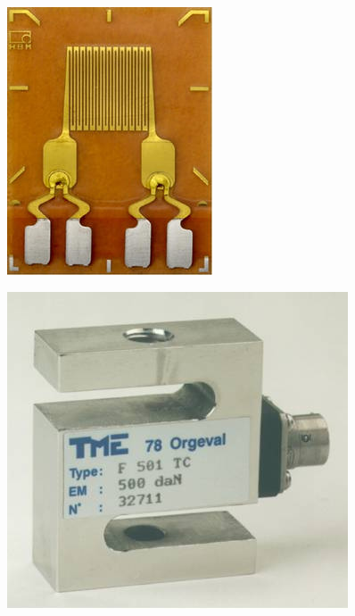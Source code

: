 \documentclass[10pt]{article}
\begin{document}
\begin{minipage}[c]{.2\linewidth}
\begin{center}
    \includegraphics[width=.9\textwidth]{images/jauge.png}
\end{center}
\begin{center}
    \includegraphics[width=.9\textwidth]{images/corps.png}
\end{center}
\end{minipage}
\end{document}
